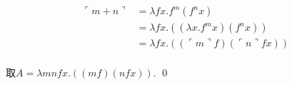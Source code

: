 \begin{pf} \rm 
$$
\begin{aligned}
\ulcorner m + n\urcorner 
&= \lambda f x. f^m(f^n x) \\
&= \lambda f x. ((\lambda x. f^m x) (f^n x)) \\
&= \lambda f x. ((\ulcorner m\urcorner f) (\ulcorner n\urcorner f x))  \\       
\end{aligned}
$$

取$A=\lambda mnfx.((mf)(nfx))$.
    \qed 
\end{pf}